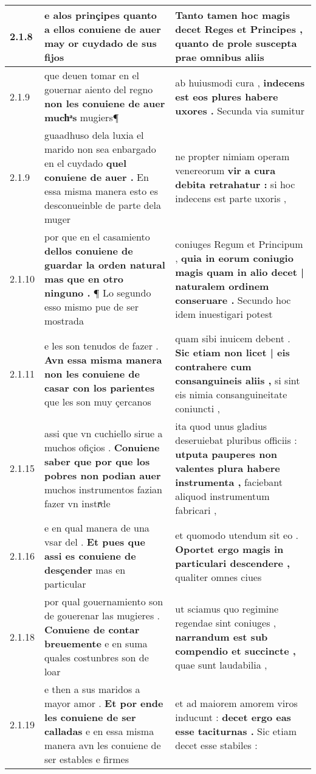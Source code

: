 \begin{tabular}{|p{1cm}|p{6.5cm}|p{6.5cm}|}
2.1.8 & e alos prinçipes \textbf{ quanto a ellos conuiene de auer } may or cuydado de sus fijos & Tanto tamen hoc magis decet Reges et Principes , \textbf{ quanto de prole suscepta } prae omnibus aliis \\\hline
2.1.9 & que deuen tomar en el gouernar aiento del regno \textbf{ non les conuiene de auer muchͣs } mugiers¶ & ab huiusmodi cura , \textbf{ indecens est eos plures habere uxores . } Secunda via sumitur \\\hline
2.1.9 & guaadhuso dela luxia el marido non sea enbargado en el cuydado \textbf{ quel conuiene de auer . } En essa misma manera esto es desconueinble de parte dela muger & ne propter nimiam operam venereorum \textbf{ vir a cura debita retrahatur : } si hoc indecens est parte uxoris , \\\hline
2.1.10 & por que en el casamiento \textbf{ dellos conuiene de guardar la orden natural mas que en otro ninguno . } ¶ Lo segundo esso mismo pue de ser mostrada & coniuges Regum et Principum , \textbf{ quia in eorum coniugio magis quam in alio decet | naturalem ordinem conseruare . } Secundo hoc idem inuestigari potest \\\hline
2.1.11 & e les son tenudos de fazer . \textbf{ Avn essa misma manera non les conuiene de casar con los parientes } que les son muy çercanos & quam sibi inuicem debent . \textbf{ Sic etiam non licet | eis contrahere cum consanguineis aliis , } si sint eis nimia consanguineitate coniuncti , \\\hline
2.1.15 & assi que vn cuchiello sirue a muchos ofiçios . \textbf{ Conuiene saber que por que los pobres non podian auer } muchos instrumentos fazian fazer vn instrͤde & ita quod unus gladius deseruiebat pluribus officiis : \textbf{ utputa pauperes non valentes plura habere instrumenta , } faciebant aliquod instrumentum fabricari , \\\hline
2.1.16 & e en qual manera de una vsar del . \textbf{ Et pues que assi es conuiene de desçender } mas en particular & et quomodo utendum sit eo . \textbf{ Oportet ergo magis in particulari descendere , } qualiter omnes ciues \\\hline
2.1.18 & por qual gouernamiento son de gouerenar las mugieres . \textbf{ Conuiene de contar breuemente } e en suma quales costunbres son de loar & ut sciamus quo regimine regendae sint coniuges , \textbf{ narrandum est sub compendio et succincte , } quae sunt laudabilia , \\\hline
2.1.19 & e then a sus maridos a mayor amor . \textbf{ Et por ende les conuiene de ser calladas } e en essa misma manera avn les conuiene de ser estables e firmes & et ad maiorem amorem viros inducunt : \textbf{ decet ergo eas esse taciturnas . } Sic etiam decet esse stabiles : \\\hline

\end{tabular}
